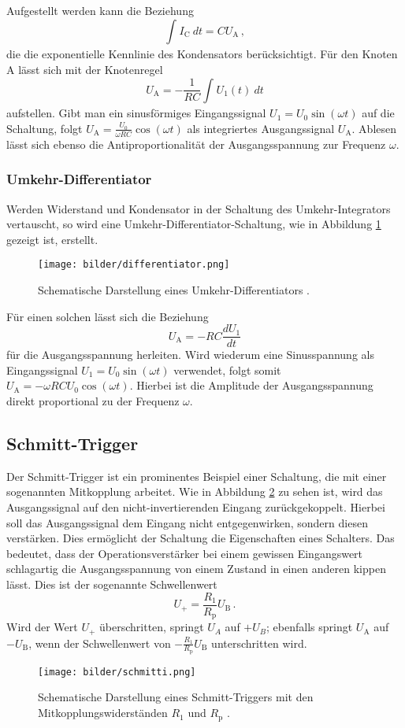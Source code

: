 Aufgestellt werden kann die Beziehung
\begin{equation}
  \int_{}^{} I_\text{C} \ dt=CU_\text{A}\,,
\end{equation}
die die exponentielle Kennlinie des Kondensators berücksichtigt.
Für den Knoten A lässt sich mit der Knotenregel
\begin{equation}
  U_\text{A}=-\frac{1}{RC}\int_{}^{} U_1(t) \ dt
\end{equation}
aufstellen. Gibt man ein sinusförmiges Eingangssignal $U_1=U_0\sin(\omega t)$ auf die Schaltung, folgt $U_\text{A}=\frac{U_0}{\omega RC}\cos(\omega t)$ als integriertes Ausgangssignal $U_\text{A}$. Ablesen lässt sich ebenso die Antiproportionalität der Ausgangsspannung zur Frequenz $\omega$.
\subsubsection{Umkehr-Differentiator}
Werden Widerstand und Kondensator in der Schaltung des Umkehr-Integrators vertauscht, so wird eine Umkehr-Differentiator-Schaltung, wie in Abbildung \ref{differentiator} gezeigt ist, erstellt.

\begin{figure}[H]
  \centering
  \texttt{[image: bilder/differentiator.png]}
  \caption{Schematische Darstellung eines Umkehr-Differentiators \cite{anleitung}.}
  \label{differentiator}
\end{figure}

Für einen solchen lässt sich die Beziehung
\begin{equation}
  U_\text{A}=-RC\frac{dU_1}{dt}
\end{equation}
für die Ausgangsspannung herleiten. Wird wiederum eine Sinusspannung als Eingangssignal $U_1=U_0\sin(\omega t)$ verwendet, folgt somit $U_\text{A}=-\omega RCU_0\cos(\omega t)$. Hierbei ist die Amplitude der Ausgangsspannung direkt proportional zu der Frequenz $\omega$.
\subsection{Schmitt-Trigger}
Der Schmitt-Trigger ist ein prominentes Beispiel einer Schaltung, die mit einer sogenannten Mitkopplung arbeitet. Wie in Abbildung \ref{schmitti} zu sehen ist, wird das Ausgangssignal auf den nicht-invertierenden Eingang zurückgekoppelt. Hierbei soll das Ausgangssignal dem Eingang nicht entgegenwirken, sondern diesen verstärken. Dies ermöglicht der Schaltung die Eigenschaften eines Schalters. Das bedeutet, dass der Operationsverstärker bei einem gewissen Eingangswert schlagartig die Ausgangsspannung von einem Zustand in einen anderen kippen lässt.
Dies ist der sogenannte Schwellenwert
\begin{equation}
U_+=\frac{R_1}{R_\text{p}}U_\text{B}\,.
\end{equation}
Wird der Wert $U_+$ überschritten, springt $U_A$ auf $+U_B$; ebenfalls springt $U_\text{A}$ auf $-U_\text{B}$, wenn der Schwellenwert von $-\frac{R_1}{R_\text{p}}U_\text{B}$ unterschritten wird.

\begin{figure}[H]
  \centering
  \texttt{[image: bilder/schmitti.png]}
  \caption{Schematische Darstellung eines Schmitt-Triggers mit den Mitkopplungswiderständen $R_1$ und $R_\text{p}$ \cite{anleitung}.}
  \label{schmitti}
\end{figure}
